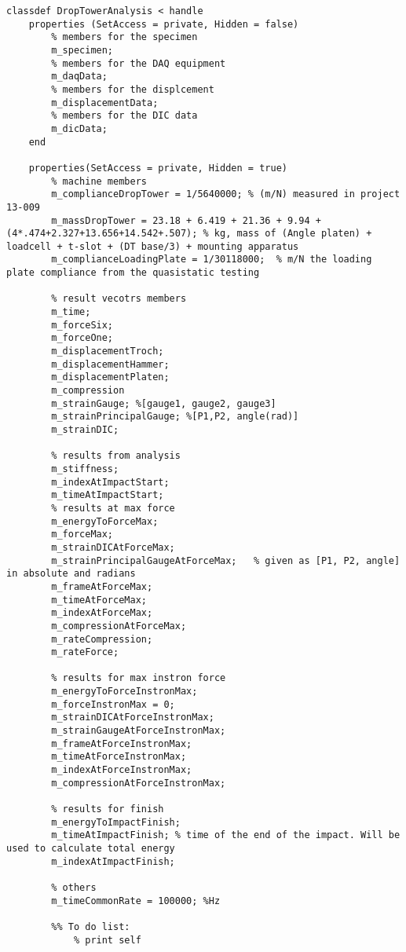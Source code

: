 \begin{lstlisting}
classdef DropTowerAnalysis < handle
    properties (SetAccess = private, Hidden = false)
        % members for the specimen
        m_specimen;
        % members for the DAQ equipment
        m_daqData;
        % members for the displcement
        m_displacementData;
        % members for the DIC data
        m_dicData;
    end
    
    properties(SetAccess = private, Hidden = true)    
        % machine members
        m_complianceDropTower = 1/5640000; % (m/N) measured in project 13-009
        m_massDropTower = 23.18 + 6.419 + 21.36 + 9.94 + (4*.474+2.327+13.656+14.542+.507); % kg, mass of (Angle platen) + loadcell + t-slot + (DT base/3) + mounting apparatus
        m_complianceLoadingPlate = 1/30118000;  % m/N the loading plate compliance from the quasistatic testing
        
        % result vecotrs members
        m_time;
        m_forceSix;
        m_forceOne;
        m_displacementTroch;
        m_displacementHammer;
        m_displacementPlaten;
        m_compression
        m_strainGauge; %[gauge1, gauge2, gauge3]
        m_strainPrincipalGauge; %[P1,P2, angle(rad)]
        m_strainDIC;
        
        % results from analysis
        m_stiffness; 
        m_indexAtImpactStart; 
        m_timeAtImpactStart; 
        % results at max force
        m_energyToForceMax; 
        m_forceMax; 
        m_strainDICAtForceMax; 
        m_strainPrincipalGaugeAtForceMax;   % given as [P1, P2, angle] in absolute and radians
        m_frameAtForceMax; 
        m_timeAtForceMax; 
        m_indexAtForceMax; 
        m_compressionAtForceMax;
        m_rateCompression;
        m_rateForce;
        
        % results for max instron force
        m_energyToForceInstronMax; 
        m_forceInstronMax = 0;
        m_strainDICAtForceInstronMax; 
        m_strainGaugeAtForceInstronMax; 
        m_frameAtForceInstronMax; 
        m_timeAtForceInstronMax; 
        m_indexAtForceInstronMax; 
        m_compressionAtForceInstronMax; 
        
        % results for finish
        m_energyToImpactFinish; 
        m_timeAtImpactFinish; % time of the end of the impact. Will be used to calculate total energy
        m_indexAtImpactFinish; 
        
        % others
        m_timeCommonRate = 100000; %Hz
        
        %% To do list:
            % print self


\end{lstlisting}
